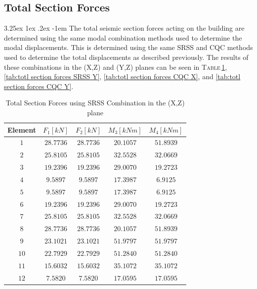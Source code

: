 \documentclass[11pt,a4paper,titlepage]{report}
\makeatletter
\renewcommand\paragraph{\@startsection{paragraph}{5}{\z@}%
  {3.25ex \@plus1ex \@minus.2ex}%
  {-1em}%
  {\normalfont\normalsize\bfseries}}
\makeatother
\begin{document}
\subsection{Total Section Forces}\label{sec: Low Rise - Total Section Forces}
\paragraph{} The total seismic section forces acting on the building are determined using the same modal combination methods used to determine the modal displacements. This is determined using the same SRSS and CQC methods used to determine the total displacements as described previously. The results of these combinations in the (X,Z) and (Y,Z) planes can be seen in \textsc{Table}\,\ref{tab:totl section forces SRSS X}, \ref{tab:totl section forces SRSS Y}, \ref{tab:totl section forces CQC X}, and \ref{tab:totl section forces CQC Y}.
\begin{table}[h]
    \centering
    \begin{tabular}{c|c|c|c|c}
    Element & $F_1 [kN]$ & $F_2 [kN]$ & $M_3 [kNm]$ & $M_4 [kNm]$ \\
    \hline
       $1$ & $28.7736$ & $28.7736$ & $ 20.1057$ & $51.8939$ \\
       $2$ & $ 25.8105$ & $25.8105$ & $32.5528$ & $32.0669$ \\
       $3$ & $19.2396$ & $19.2396$ & $29.0070$ & $19.2723$ \\
       $4$ & $9.5897$ & $9.5897$ & $17.3987$ & $6.9125$ \\
       $5$ & $ 9.5897 $ & $9.5897$ & $17.3987$ & $ 6.9125$ \\
       $6$ & $19.2396$ & $19.2396$ & $29.0070$ & $19.2723$ \\
       $7$ & $25.8105$ & $25.8105$ & $32.5528$ & $32.0669$ \\
       $8$ & $ 28.7736$ & $28.7736$ & $20.1057$ & $51.8939$ \\
       $9$ & $23.1021$ & $23.1021$ & $51.9797$ & $51.9797$ \\
       $10$ & $22.7929$ & $22.7929$ & $51.2840$ & $51.2840$ \\
       $11$ & $ 15.6032 $ & $ 15.6032 $ & $35.1072$ & $35.1072$ \\
       $12$ & $ 7.5820$ & $ 7.5820$ & $17.0595$ & $17.0595$ \\
    \end{tabular}
    \caption{Total Section Forces using SRSS Combination in the (X,Z) plane}
    \label{tab:totl section forces SRSS X}
\end{table}
\end{document}
